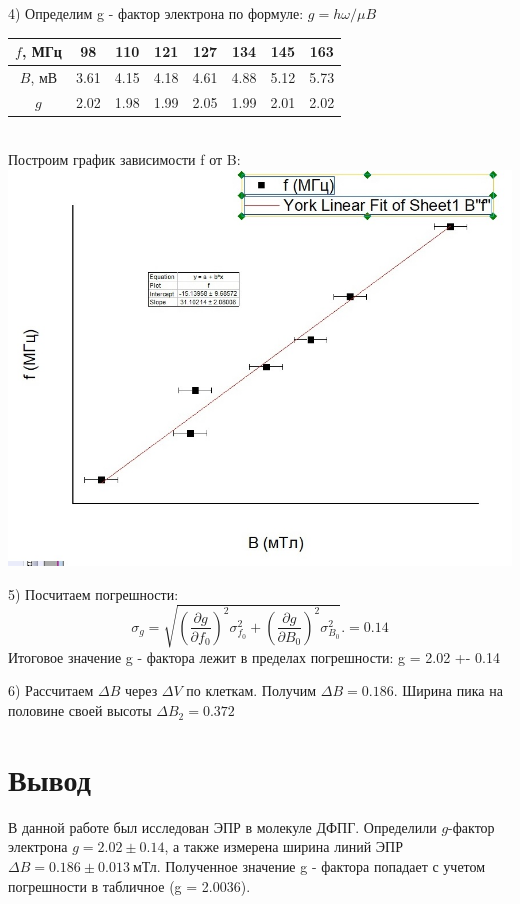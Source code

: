 \documentclass[%
reprint,
amsmath,amssymb,
aps,
]{revtex4-2}
\begin{document}
4) Определим g - фактор электрона по формуле: $g = h \omega / \mu B$
\begin{table}[h]
\begin{tabular}{|c|c|c|c|c|c|c|c|}
\hline
$f$, МГц & 98 & 110 & 121 & 127 & 134 & 145 & 163 \\ \hline
$B$, мВ & 3.61 & 4.15 & 4.18 & 4.61 & 4.88 & 5.12 & 5.73 \\ \hline
$g$ & 2.02 & 1.98 & 1.99 & 2.05 & 1.99 & 2.01 & 2.02 \\ \hline
\end{tabular}
\centering
\end{table}\\

Построим график зависимости f от B:
\includegraphics[scale = 0.4]{two.jpg}

5) Посчитаем погрешности:
\[\sigma_g = \sqrt{ \left( \dfrac{\partial g}{\partial f_0}\right)^2 \sigma_{f_0}^2 + \left( \dfrac{\partial g}{\partial B_0}\right)^2 \sigma_{B_0}^2}. = 0.14\]
Итоговое значение g - фактора лежит в пределах погрешности: g = 2.02 +- 0.14

6) Рассчитаем $\Delta B$ через $\Delta V$ по клеткам. Получим $\Delta B = 0.186$. Ширина пика на
половине своей высоты $\Delta B_2 = 0.372$

\section*{Вывод}
В данной работе был исследован ЭПР в молекуле ДФПГ. Определили $g$-фактор электрона $g = 2.02 \pm 0.14$, а также измерена ширина линий ЭПР $\Delta B = 0.186 \pm 0.013~\text{мТл}$. Полученное значение g - фактора попадает с учетом погрешности в табличное (g = 2.0036).
\end{document}
